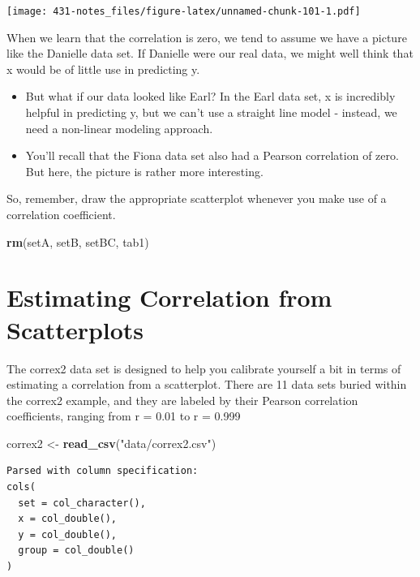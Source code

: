 \documentclass[
]{book}
\newenvironment{Shaded}{\begin{snugshade}}{\end{snugshade}}
\newcommand{\KeywordTok}[1]{\textcolor[rgb]{0.13,0.29,0.53}{\textbf{#1}}}
\newcommand{\NormalTok}[1]{#1}
\newcommand{\StringTok}[1]{\textcolor[rgb]{0.31,0.60,0.02}{#1}}
\providecommand{\tightlist}{%
  \setlength{\itemsep}{0pt}\setlength{\parskip}{0pt}}
\begin{document}
\texttt{[image: 431-notes\_files/figure-latex/unnamed-chunk-101-1.pdf]}

When we learn that the correlation is zero, we tend to assume we have a picture like the Danielle data set. If Danielle were our real data, we might well think that x would be of little use in predicting y.

\begin{itemize}
\tightlist
\item
  But what if our data looked like Earl? In the Earl data set, x is incredibly helpful in predicting y, but we can't use a straight line model - instead, we need a non-linear modeling approach.
\item
  You'll recall that the Fiona data set also had a Pearson correlation of zero. But here, the picture is rather more interesting.
\end{itemize}

So, remember, draw the appropriate scatterplot whenever you make use of a correlation coefficient.

\begin{Shaded}
\begin{Highlighting}[]
\KeywordTok{rm}\NormalTok{(setA, setB, setBC, tab1)}
\end{Highlighting}
\end{Shaded}

\hypertarget{estimating-correlation-from-scatterplots}{%
\section{Estimating Correlation from Scatterplots}\label{estimating-correlation-from-scatterplots}}

The correx2 data set is designed to help you calibrate yourself a bit in terms of estimating a correlation from a scatterplot. There are 11 data sets buried within the correx2 example, and they are labeled by their Pearson correlation coefficients, ranging from r = 0.01 to r = 0.999

\begin{Shaded}
\begin{Highlighting}[]
\NormalTok{correx2 <-}\StringTok{ }\KeywordTok{read_csv}\NormalTok{(}\StringTok{"data/correx2.csv"}\NormalTok{)}
\end{Highlighting}
\end{Shaded}

\begin{verbatim}
Parsed with column specification:
cols(
  set = col_character(),
  x = col_double(),
  y = col_double(),
  group = col_double()
)
\end{verbatim}
\end{document}
